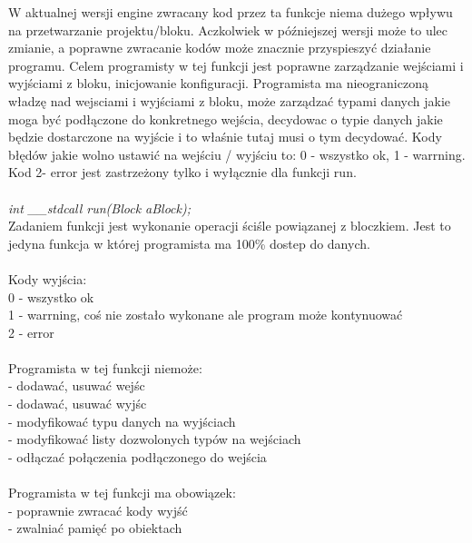 W aktualnej wersji engine zwracany kod przez ta funkcje niema dużego wpływu na przetwarzanie projektu/bloku. Aczkolwiek w późniejszej wersji może to ulec zmianie, a poprawne zwracanie kodów może znacznie przyspieszyć działanie programu. Celem programisty w tej funkcji jest poprawne zarządzanie wejściami i wyjściami z bloku, inicjowanie konfiguracji. Programista ma nieograniczoną władzę nad wejsciami i wyjściami z bloku, może zarządzać typami danych jakie moga być podłączone do konkretnego wejścia, decydowac o typie danych jakie będzie dostarczone na wyjście i to właśnie tutaj musi o tym decydować. Kody błędów jakie wolno ustawić na wejściu / wyjściu to: 0 - wszystko ok, 1 - warrning. Kod 2- error jest zastrzeżony tylko i wyłącznie dla funkcji run.\\\\
\textit{int \_\_stdcall run(Block \*aBlock);}\\
Zadaniem funkcji jest wykonanie operacji ściśle powiązanej z bloczkiem. Jest to jedyna funkcja w której programista ma 100\% dostep do danych.\\\\
Kody wyjścia:\\
0 - wszystko ok\\
1 - warrning, coś nie zostało wykonane ale program może kontynuować\\
2 - error\\
\\
Programista w tej funkcji niemoże:\\
- dodawać, usuwać wejśc\\
- dodawać, usuwać wyjśc\\
- modyfikować typu danych na wyjściach\\
- modyfikować listy dozwolonych typów na wejściach\\
- odłączać połączenia podłączonego do wejścia\\
\\
Programista w tej funkcji ma obowiązek:\\
- poprawnie zwracać kody wyjść\\
- zwalniać pamięć po obiektach\\